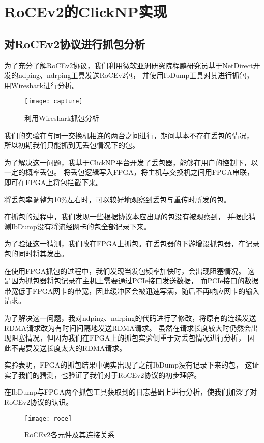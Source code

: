 \chapter{RoCEv2的ClickNP实现}
\section{对RoCEv2协议进行抓包分析}
为了充分了解RoCEv2协议，我们利用微软亚洲研究院程鹏研究员基于NetDirect开发的ndping、ndrping工具发送RoCEv2包，
并使用IbDump工具对其进行抓包，用Wireshark进行分析。
\begin{figure}[htbp]
\centering
\texttt{[image: capture]}
\caption{利用Wireshark抓包分析} \label{fig:capture}
\end{figure}

我们的实验在与同一交换机相连的两台之间进行，期间基本不存在丢包的情况，
所以初期我们只能抓到无丢包情况下的包。

为了解决这一问题，我基于ClickNP平台开发了丢包器，能够在用户的控制下，以一定的概率丢包。
将丢包逻辑写入FPGA，将主机与交换机之间用FPGA串联，即可在FPGA上将包拦截下来。

将丢包率调整为10\%左右时，可以较好地观察到丢包与重传时所发的包。

在抓包的过程中，我们发现一些根据协议本应出现的包没有被观察到，
并据此猜测IbDump没有将流经网卡的包全部记录下来。

为了验证这一猜测，我们改在FPGA上抓包。在丢包器的下游增设抓包器，在记录包的同时将其发出。

在使用FPGA抓包的过程中，我们发现当发包频率加快时，会出现阻塞情况。
这是因为抓包器将包记录在主机上需要通过PCIe接口发送数据，
而PCIe接口的数据带宽低于FPGA网卡的带宽，因此缓冲区会被迅速写满，随后不再响应网卡的输入请求。

为了解决这一问题，我对ndping、ndrping的代码进行了修改，将原有的连续发送RDMA请求改为有时间间隔地发送RDMA请求。
虽然在请求长度较大时仍然会出现阻塞情况，但因为我们在FPGA上的抓包实验侧重于对丢包情况进行分析，
因此不需要发送长度太大的RDMA请求。

实验表明，FPGA的抓包结果中确实出现了之前IbDump没有记录下来的包，
这证实了我们的猜测，也验证了我们对于RoCEv2协议的初步理解。

在IbDump与FPGA两个抓包工具获取到的日志基础上进行分析，使我们加深了对RoCEv2协议的认识。

\begin{figure}[htbp]
\centering
\texttt{[image: roce]}
\caption{RoCEv2各元件及其连接关系} \label{fig:roce}
\end{figure}

